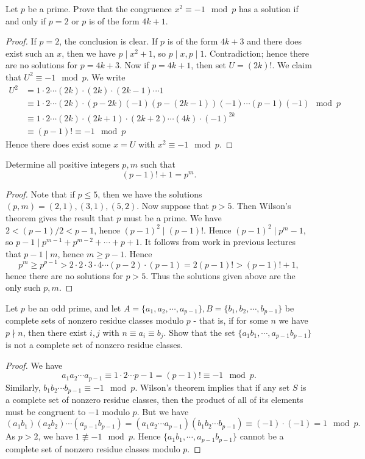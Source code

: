 \begin{prb}
Let $p$ be a prime.  Prove that the congruence $x^2 \equiv -1\mod{p}$ has a solution if and only if $p = 2$ or $p$ is of the form $4k+1$.
\begin{proof}
If $p = 2$, the conclusion is clear.  If $p$ is of the form $4k+3$ and there does exist such an $x$, then we have $p \mid x^2 + 1$, so $p \mid x, p \mid 1$.  Contradiction; hence there are no solutions for $p = 4k+3$.  Now if $p = 4k+1$, then set $U = (2k)!$.  We claim that $U^2 \equiv -1\mod{p}$.  We write
\begin{align*}
U^2&= 1\cdot2\cdots (2k)\cdot (2k)\cdot (2k-1)\cdots 1\\
&\equiv1\cdot2\cdots (2k)\cdot(p-2k)(-1)(p-(2k-1))(-1)\cdots(p-1)(-1)\mod{p}\\
&\equiv 1\cdot2\cdots (2k)\cdot(2k+1)\cdot(2k+2)\cdots (4k)\cdot(-1)^{2k}\\
&\equiv (p-1)! \equiv -1\mod{p}
\end{align*}
Hence there does exist some $x = U$ with $x^2 \equiv -1\mod{p}$.
\end{proof}
\end{prb}
\begin{prb}
Determine all positive integers $p, m$ such that $$(p-1)!+1 = p^m.$$
\begin{proof}
Note that if $p \le 5$, then we have the solutions $(p,m) = (2,1), (3, 1), (5,2)$.  Now suppose that $p > 5$.  Then Wilson's theorem gives the result that $p$ must be a prime.  We have $2 < (p-1)/2 < p-1$, hence $(p-1)^2 \mid (p-1)!$.  Hence $(p-1)^2 \mid p^m - 1$, so $p-1 \mid p^{m-1}+p^{m-2}+\cdots+p+1$.  It follows from work in previous lectures that $p - 1 \mid m$, hence $m \ge p-1$.  Hence $$p^m \ge p^{p-1} > 2\cdot2\cdot3\cdot4\cdots (p-2)\cdot(p-1) = 2(p-1)! > (p-1)!+1,$$ hence there are no solutions for $p > 5$.  Thus the solutions given above are the only such $p, m$.
\end{proof}
\end{prb}
\begin{prb}
Let $p$ be an odd prime, and let $A = \{a_1, a_2, \cdots, a_{p-1}\}, B = \{b_1, b_2, \cdots, b_{p-1}\}$ be complete sets of nonzero residue classes modulo $p$ - that is, if for some $n$ we have $p \nmid n$, then there exist $i, j$ with $n \equiv a_i \equiv b_j$.  Show that the set $\{a_1b_1, \cdots, a_{p-1}b_{p-1}\}$ is not a complete set of nonzero residue classes.
\begin{proof}
We have $$a_1a_2\cdots a_{p-1} \equiv 1\cdot2\cdots p-1 = (p-1)! \equiv -1\mod{p}.$$  Similarly, $b_1b_2\cdots b_{p-1} \equiv -1\mod{p}$.  Wilson's theorem implies that if any set $S$ is a complete set of nonzero residue classes, then the product of all of its elements must be congruent to $-1$ modulo $p$.  But we have $$(a_1b_1)(a_2b_2)\cdots(a_{p-1}b_{p-1}) = (a_1a_2\cdots a_{p-1})(b_1b_2\cdots b_{p-1}) \equiv (-1)\cdot(-1) = 1\mod{p}.$$  As $p > 2$, we have $1 \not\equiv -1\mod{p}$.  Hence $\{a_1b_1, \cdots, a_{p-1}b_{p-1}\}$ cannot be a complete set of nonzero residue classes modulo $p$.
\end{proof}
\end{prb}
